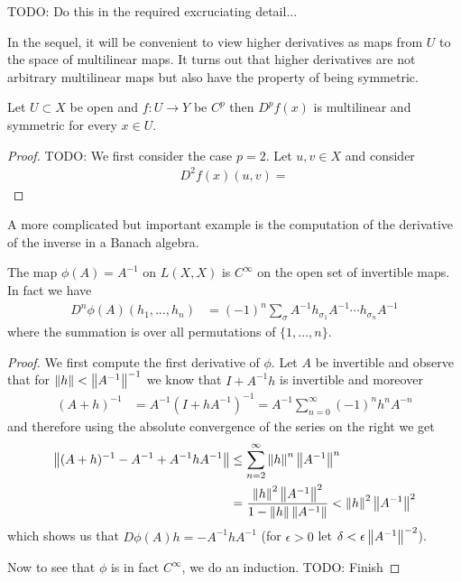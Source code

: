 TODO: Do this in the required excruciating detail...

In the sequel, it will be convenient to view higher derivatives as maps
from $U$ to the space of multilinear maps.  It turns out that higher
derivatives are not arbitrary multilinear maps but also have the
property of being symmetric.
\begin{prop}Let $U \subset X$ be open and $f : U \to Y$ be $C^p$ then
  $D^pf(x)$ is multilinear and symmetric for every $x \in U$.
\end{prop}
\begin{proof}
TODO:
We first consider the case $p=2$.  Let $u,v \in X$ and consider
\begin{align*}
D^2f(x) (u,v) = 
\end{align*}
\end{proof}

A more complicated but important example is the computation of the
derivative of the inverse in a Banach algebra.
\begin{prop}\label{FrechetDerivativeOfInverse}The map $\phi(A) = A^{-1}$ on $L(X,X)$ is $C^\infty$ on the open set of
  invertible maps.  In fact we have
\begin{align*}
D^n\phi(A)(h_1, \dotsc, h_n) &= (-1)^n\sum_\sigma A^{-1} h_{\sigma_1}
                               A^{-1} \dotsm h_{\sigma_n} A^{-1}
\end{align*}
where the summation is over all permutations of $\lbrace 1, \dotsc, n \rbrace$.
\end{prop}
\begin{proof}
We first compute the first derivative of $\phi$.  Let $A$ be invertible and
observe that for $\left \lVert h \right \rVert < \left \lVert A^{-1} \right \rVert^{-1}$ we know that $I +
A^{-1} h$ is invertible and moreover
\begin{align*}
(A + h)^{-1} &= A^{-1} (I + h A^{-1})^{-1} = A^{-1} \sum_{n=0}^\infty
              (-1)^n h^n A^{-n}
\end{align*}
and therefore using the absolute convergence of the series on the
right we get
\begin{align*}
\left \lVert (A + h)^{-1} - A^{-1} + A^{-1} h A^{-1} \right \rVert &\leq \sum_{n=2}^\infty
                                                 \left \lVert h \right \rVert^n
                                                 \left \lVert A^{-1} \right \rVert^n \\
&= \frac{\left \lVert h \right \rVert^2\left \lVert A^{-1} \right \rVert^2}{1 - \left \lVert h \right \rVert\left \lVert A^{-1} \right \rVert} < \left \lVert h \right \rVert^2\left \lVert A^{-1} \right \rVert^2
\end{align*}
which shows us that $D\phi(A)h = -A^{-1} h A^{-1}$ (for $\epsilon > 0$
let $\delta < \epsilon \left \lVert A^{-1} \right \rVert^{-2}$).

Now to see that $\phi$ is in fact $C^{\infty}$, we do an induction.
TODO: Finish
\end{proof}

